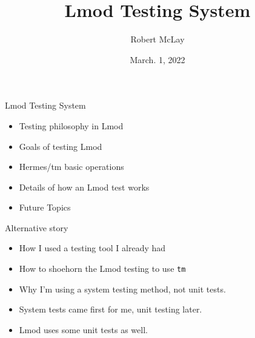 \documentclass{beamer}
\begin{document}
\title[Lmod]{Lmod Testing System}
\author{Robert McLay} 
\date{March. 1, 2022}

\frame{\titlepage} 


\begin{frame}{Lmod Testing System}
  \begin{itemize}
    \item Testing philosophy in Lmod
    \item Goals of testing Lmod
    \item Hermes/tm basic operations
    \item Details of how an Lmod test works
    \item Future Topics
  \end{itemize}
\end{frame}

\begin{frame}{Alternative story}
  \begin{itemize}
    \item How I used a testing tool I already had
    \item How to shoehorn the Lmod testing to use \texttt{tm}
    \item Why I'm using a system testing method, not unit tests.
    \item System tests came first for me, unit testing later.
    \item Lmod uses some unit tests as well.
  \end{itemize}
\end{frame}
\end{document}
